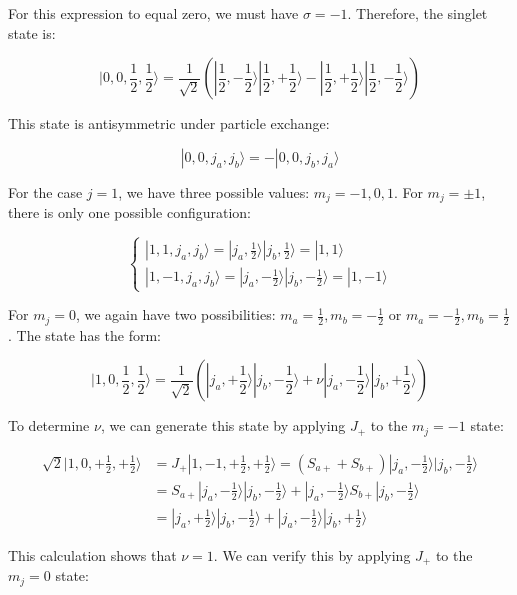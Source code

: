For this expression to equal zero, we must have $\sigma=-1$. Therefore, the singlet state is:

\begin{equation}
|0,0,\frac{1}{2},\frac{1}{2}\rangle=\frac{1}{\sqrt{2}}(|\frac{1}{2},-\frac{1}{2}\rangle|\frac{1}{2},+\frac{1}{2}\rangle-|\frac{1}{2},+\frac{1}{2}\rangle|\frac{1}{2},-\frac{1}{2}\rangle)
\end{equation}

This state is antisymmetric under particle exchange:

\begin{equation}
|0,0,j_a,j_b\rangle=-|0,0,j_b,j_a\rangle
\end{equation}

For the case $j=1$, we have three possible values: $m_j=-1,0,1$. For $m_j=\pm 1$, there is only one possible configuration:

\[
\left\{\begin{array}{l}
|1,1,j_a,j_b\rangle=|j_a,\frac{1}{2}\rangle|j_b,\frac{1}{2}\rangle=|1,1\rangle  \\
|1,-1,j_a,j_b\rangle=|j_a,-\frac{1}{2}\rangle|j_b,-\frac{1}{2}\rangle=|1,-1\rangle
\end{array}\right.
\]

For $m_j=0$, we again have two possibilities: $m_a=\frac{1}{2}, m_b=-\frac{1}{2}$ or $m_a=-\frac{1}{2}, m_b=\frac{1}{2}$. The state has the form:

\begin{equation}
|1,0,\frac{1}{2},\frac{1}{2}\rangle=\frac{1}{\sqrt{2}}(|j_a,+\frac{1}{2}\rangle|j_b,-\frac{1}{2}\rangle+\nu|j_a,-\frac{1}{2}\rangle|j_b,+\frac{1}{2}\rangle)
\end{equation}

To determine $\nu$, we can generate this state by applying $J_+$ to the $m_j=-1$ state:

\begin{align}
\sqrt{2}|1,0,+\frac{1}{2},+\frac{1}{2}\rangle &= J_{+}|1,-1,+\frac{1}{2},+\frac{1}{2}\rangle=(S_{a+}+S_{b+})|j_a,-\frac{1}{2}\rangle|j_b,-\frac{1}{2}\rangle \\
&= S_{a+}|j_a,-\frac{1}{2}\rangle|j_b,-\frac{1}{2}\rangle+|j_a,-\frac{1}{2}\rangle S_{b+}|j_b,-\frac{1}{2}\rangle \\
&= |j_a,+\frac{1}{2}\rangle|j_b,-\frac{1}{2}\rangle+|j_a,-\frac{1}{2}\rangle|j_b,+\frac{1}{2}\rangle
\end{align}

This calculation shows that $\nu=1$. We can verify this by applying $J_+$ to the $m_j=0$ state:

